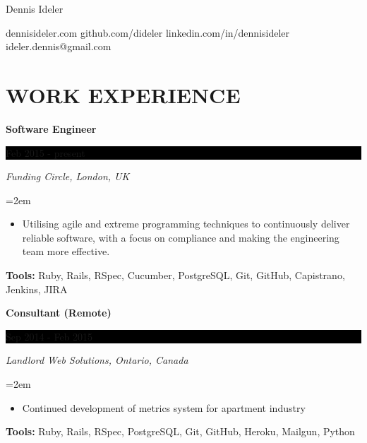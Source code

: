 \documentclass[paper=a4,fontsize=11pt]{scrartcl} %
\newlength{\spacebox}
\newcommand{\sepspace}{\vspace*{1em}}   %
\newcommand{\MyName}[1]{ %
    \Huge \usefont{OT1}{phv}{b}{n} \hfill #1
    \par \normalsize \normalfont}
\newcommand{\MySlogan}[1]{ %
    \large \usefont{OT1}{phv}{m}{n}\hfill \textit{#1}
    \par \normalsize \normalfont}
\newcommand{\NewPart}[1]{\section*{\uppercase{#1}}}
\newcommand{\PersonalEntry}[2]{
    \noindent\hangindent=2em\hangafter=0 %
    \parbox{\spacebox}{                  %
    \textit{#1}}                      %
    \hspace{1.5em} #2 \par}              %
\newcommand{\EducationEntry}[4]{
    \noindent \textbf{#1} \hfill      %
    \colorbox{Black}{
      \parbox{8.5em}{
      \hfill\color{White}#2}} \par  %
    \noindent \textit{#3} \par        %
    \noindent\hangindent=2em\hangafter=0 \small #4 %
    \normalsize \par}
\newcommand{\WorkEntry}[4]{       %
    \noindent \textbf{#1} \hfill      %
    \colorbox{Black}{%
      \parbox{9em}{%
      \hfill\color{White}#2}} \par   %
        \noindent \textit{#3} \par        %
    \noindent\hangindent=2em\hangafter=0 \small #4 %
    \normalsize \par}
\begin{document}
\MyName{Dennis Ideler}
\bigskip
{\small dennisideler.com \quad github.com/dideler \quad linkedin.com/in/dennisideler \quad ideler.dennis@gmail.com}

\sepspace

%


\NewPart{Work experience}{}


\WorkEntry{Software Engineer}{Feb 2015 - present}
{Funding Circle, London, UK}
{
 \begin{itemize} \itemsep -1pt
   \item Utilising agile and extreme programming techniques to continuously deliver reliable software,
   with a focus on compliance and making the engineering team more effective.
 \end{itemize}
 \textbf{Tools:} Ruby, Rails, RSpec, Cucumber, PostgreSQL, Git, GitHub, Capistrano, Jenkins, JIRA
}
\sepspace

\WorkEntry{Consultant (Remote)}{Sep 2014 - Feb 2015}
{Landlord Web Solutions, Ontario, Canada}
{
 \begin{itemize} \itemsep -1pt
   \item Continued development of metrics system for apartment industry
 \end{itemize}
 \textbf{Tools:} Ruby, Rails, RSpec, PostgreSQL, Git, GitHub, Heroku, Mailgun, Python
}
\sepspace
\end{document}
